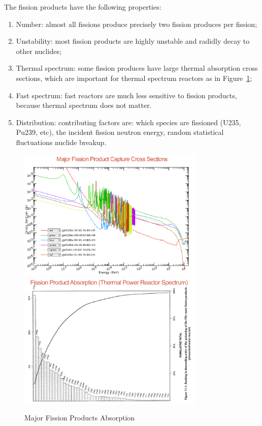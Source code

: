 \documentclass{school-22.211-notes}
\begin{document}
The fission products have the following properties: 
\begin{enumerate}
\item Number: almost all fissions produce precisely two fission produces per fission;
\item Unstability: most fission products are highly unstable and radidly decay to other nuclides;
\item Thermal spectrum: some fission produces have large thermal absorption cross sections, which are important for thermal spectrum reactors as in Figure~\ref{major-capture};
\item Fast spectrum: fast reactors are much less sensitive to fission products, because thermal spectrum does not matter. 
\item Distribution: contributing factors are: which species are fissioned (U235, Pu239, etc), the incident fission neutron energy, random statistical fluctuations nuclide breakup.
\end{enumerate}
\begin{figure}
  \centering
  \includegraphics[width=3.5in]{images/dfs/fission-product-capture-xs.png}
  \includegraphics[width=3.5in]{images/dfs/fission-product-absorption.png}
  \caption{Major Fission Products Absorption} \label{major-capture} 
\end{figure}
\end{document}
